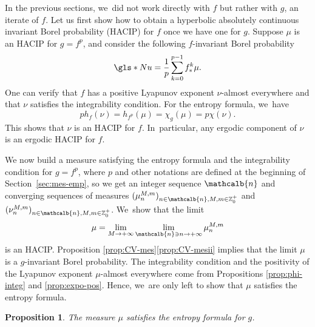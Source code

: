 \documentclass[10pt]{amsart}
\newcommand{\mcbn}{{\mathcalb{n}}}
\newtheorem{prop}[thm]{Proposition}
\theoremstyle{definition}
\newcommand{\bbZ}{{\mathbb{Z}}}
\begin{document}
In the previous sections, we~did not work directly with $f$ but rather with $g$, an iterate of $f$. Let us first show how to obtain a hyperbolic absolutely continuous invariant Borel probability (\gls*{HACIP}) for $f$ once we have one for $g$.
Suppose $\mu$ is an HACIP for $g = f^p$, and consider the following $f$\nobreakdash-invariant Borel probability
\[
\gls*{Nu} = \frac{1}{p}\sum_{k=0}^{p-1} f^k_* \mu.
\]
One can verify that $f$ has a positive Lyapunov exponent $\nu$-almost everywhere and that $\nu$ satisfies the integrability condition.
For the entropy formula, we~have
\[
p h_f(\nu) = h_{f^p}(\mu) = \chi_g(\mu) = p \chi(\nu).
\]
This shows that $\nu$ is an HACIP for $f$. In~particular, any ergodic component of $\nu$ is an ergodic HACIP for $f$.

We now build a measure satisfying the entropy formula and the integrability condition for $g = f^p$, where $p$ and other notations are defined at the beginning of Section~\ref{sec:mes-emp}, so we get an integer sequence $\mcbn$ and converging sequences of measures $(\mu_n^{M,m})_{n \in \mcbn, M,m \in \bbZ_0^+}$ and $(\nu_n^{M,m})_{n \in \mcbn, M,m \in \bbZ_0^+}$. We~show that the limit
\[
\mu = \lim_{M \to +\infty} \lim_{\mcbn \ni n \to +\infty} \mu_n^{M,m}
\]
is an HACIP.
Proposition \ref{prop:CV-mes}\eqref{prop:CV-mesii} implies that the limit $\mu$ is a $g$-invariant Borel probability.
The integrability condition and the positivity of the Lyapunov exponent $\mu$\nobreakdash-almost everywhere come from Propositions \ref{prop:phi-integ} and \ref{prop:expo-pos}.
Hence, we~are only left to show that $\mu$ satisfies the entropy formula.

\begin{prop}
\label{prop:formule-entropie}
The measure $\mu$ satisfies the entropy formula for $g$.
\end{prop}
\end{document}
